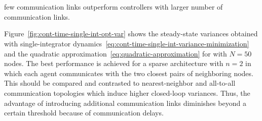 
\section{{}}\label{sec:numerical-results}

 {few communication links outperform controllers with larger number of communication links.}

\textcolor{subsectioncolor}{Figure~\ref{fig:cont-time-single-int-opt-var}} shows the steady-state variances
obtained with single-integrator dynamics~\eqref{eq:cont-time-single-int-variance-minimization}
and the quadratic approximation~\eqref{eq:quadratic-approximation} for 
with $ N = 50 $ nodes. %
{The best performance is achieved for a sparse architecture with  $ n = 2 $ 
in which each agent communicates with the two closest pairs of neighboring nodes. 
This should be compared and contrasted to nearest-neighbor and all-to-all 
communication topologies which induce higher closed-loop variances. 
Thus, 
the advantage of introducing additional communication links diminishes 
beyond}
{a certain threshold because of communication delays.}

